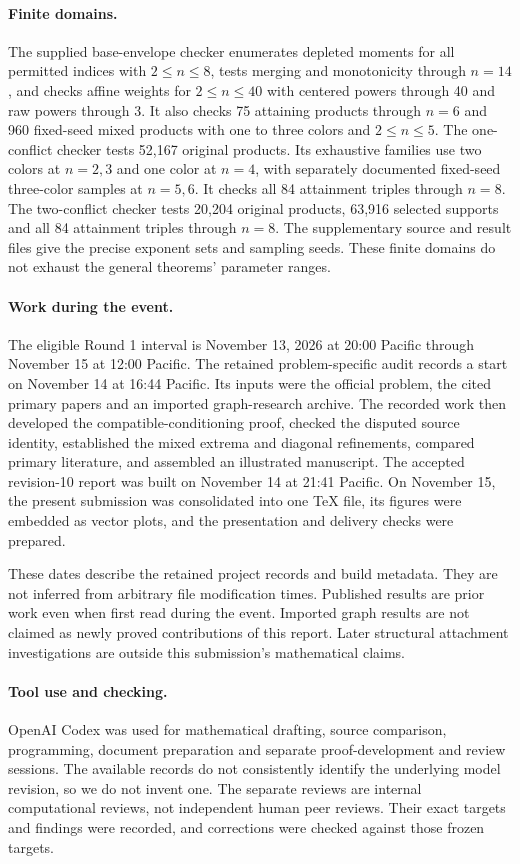 \documentclass[11pt]{article}
\theoremstyle{definition}
\theoremstyle{remark}
\newcommand{\1}{\mathbf 1}
\begin{document}
\paragraph{Finite domains.}
The supplied base-envelope checker enumerates depleted moments for all permitted indices with $2\le n\le8$, tests merging and monotonicity through $n=14$, and checks affine weights for $2\le n\le40$ with centered powers through 40 and raw powers through 3. It also checks 75 attaining products through $n=6$ and 960 fixed-seed mixed products with one to three colors and $2\le n\le5$. The one-conflict checker tests 52,167 original products. Its exhaustive families use two colors at $n=2,3$ and one color at $n=4$, with separately documented fixed-seed three-color samples at $n=5,6$. It checks all 84 attainment triples through $n=8$. The two-conflict checker tests 20,204 original products, 63,916 selected supports and all 84 attainment triples through $n=8$. The supplementary source and result files give the precise exponent sets and sampling seeds. These finite domains do not exhaust the general theorems' parameter ranges.

\paragraph{Work during the event.}
The eligible Round 1 interval is November 13, 2026 at 20:00 Pacific through November 15 at 12:00 Pacific. The retained problem-specific audit records a start on November 14 at 16:44 Pacific. Its inputs were the official problem, the cited primary papers and an imported graph-research archive. The recorded work then developed the compatible-conditioning proof, checked the disputed source identity, established the mixed extrema and diagonal refinements, compared primary literature, and assembled an illustrated manuscript. The accepted revision-10 report was built on November 14 at 21:41 Pacific. On November 15, the present submission was consolidated into one TeX file, its figures were embedded as vector plots, and the presentation and delivery checks were prepared.

These dates describe the retained project records and build metadata. They are not inferred from arbitrary file modification times. Published results are prior work even when first read during the event. Imported graph results are not claimed as newly proved contributions of this report. Later structural attachment investigations are outside this submission's mathematical claims.

\paragraph{Tool use and checking.}
OpenAI Codex was used for mathematical drafting, source comparison, programming, document preparation and separate proof-development and review sessions. The available records do not consistently identify the underlying model revision, so we do not invent one. The separate reviews are internal computational reviews, not independent human peer reviews. Their exact targets and findings were recorded, and corrections were checked against those frozen targets.
\end{document}
